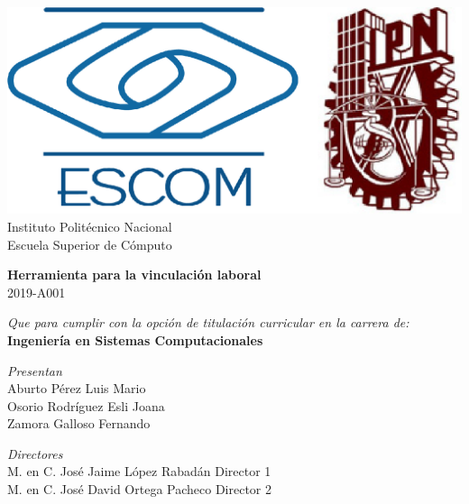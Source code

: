 
\begin{titlepage}

    \centering %

    \includegraphics[scale=0.17]{imagenes/escom-ipn} %
    \LARGE{\\ Instituto Polit\'ecnico Nacional}
    \LARGE{\\ Escuela Superior de C\'omputo}
    
    \vspace{1cm} %

    \LARGE \textbf{ Herramienta para la vinculaci\'on laboral}
    \LARGE {\\ 2019-A001}

    \vspace{1cm} %

    \LARGE \textit{Que para cumplir con la opción de titulación curricular en la carrera de:}
    \LARGE \textbf{\\ Ingeniería en Sistemas Computacionales}

    \vspace{1cm} %

   \textit{Presentan}\\
    Aburto P\'erez Luis Mario \\
    Osorio Rodr\'iguez Esli Joana \\
    Zamora Galloso Fernando

    \vspace{1cm} %

   \textit{Directores}\\
   M. en C. José Jaime López Rabadán \bigskip  Director 1\\
    M. en C. José David Ortega Pacheco \bigskip  Director 2

\end{titlepage}
